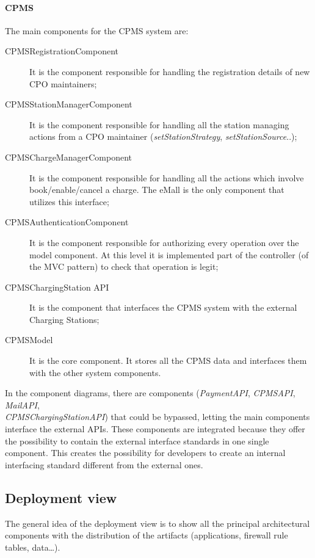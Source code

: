 \paragraph{\textbf{\ac{CPMS}}}
The main components for the \ac{CPMS} system are:
\begin{description}
    \item [\label{CPMSRegistrationComponent}CPMSRegistrationComponent] It is the component responsible for handling the registration details of new \ac{CPO} maintainers;
    \item [\label{CPMSStationManagerComponent}CPMSStationManagerComponent] It is the component responsible for handling all the station managing actions from a \ac{CPO} maintainer (\textit{setStationStrategy}, \textit{setStationSource}..);
    \item [\label{CPMSChargeManagerComponent}CPMSChargeManagerComponent] It is the component responsible for handling all the actions which involve book/enable/cancel a charge. The \ac{eMall} is the only component that utilizes this interface;
    \item [\label{CPMSAuthenticationComponent}CPMSAuthenticationComponent] It is the component responsible for authorizing every operation over the model component. At this level it is implemented part of the controller (of the \ac{MVC} pattern) to check that operation is legit;
    \item [\label{CPMSChargingStationAPI}CPMSChargingStation API] It is the component that interfaces the \ac{CPMS} system with the external Charging Stations;
    \item [\label{CPMSModel}CPMSModel] It is the core component. It stores all the \ac{CPMS} data and interfaces them with the other system components.
\end{description}
In the component diagrams, there are components (\textit{Payment\ac{API}}, \textit{\ac{CPMS}\ac{API}}, \textit{Mail\ac{API}}, \\\textit{\ac{CPMS}ChargingStationAPI}) that could be bypassed, letting the main components interface the external \acp{API}. These components are integrated because they offer the possibility to contain the external interface standards in one single component. This creates the possibility for developers to create an internal interfacing standard different from the external ones.

\subsection{Deployment view}
The general idea of the deployment view is to show all the principal architectural components with the distribution of the artifacts (applications, firewall rule tables, data\ldots).

